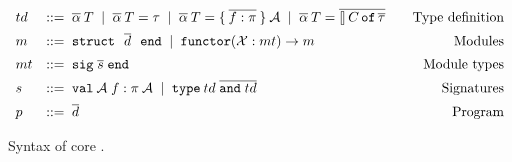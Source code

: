\documentclass{easychair}
\newcommand{\atts}{\mathcal{A}}
\begin{document}
\begin{figure}
\[\begin{array}{llr}
    td & ::= \; \alphabar \: T
         \sep \alphabar \: T = \tau
         \sep \alphabar \: T = \{\: \overline{f : \pi}\:\}\: \atts
         \sep \alphabar \: T =
         \overline{\talloblong\,C\,\texttt{of}\,\overline{\tau}}
    & \alabel{Type definition}\\[.5em]

    m & ::= \; \texttt{struct}~~\overline{d}~~\texttt{end}
        \sep \texttt{functor}(\mathcal{X}: mt) \rightarrow m
            & \alabel{Modules} \\[.5em]

    mt & ::= \; \texttt{sig}\;\overline{s}\;\texttt{end} & \alabel{Module
                                                           types}\\[.5em]

    s & ::= \; \texttt{val}\:\atts\;f : \pi \: \atts
        \sep \texttt{type}\: td \; \overline{\texttt{and}\; td}
    & \alabel{Signatures}\\[.5em]

    p & ::= \; \overline{d} & \alabel{Program}
  \end{array}
\]
\caption{Syntax of core \ocaml.}
\label{fig:core-ocaml}
\end{figure}
\end{document}
